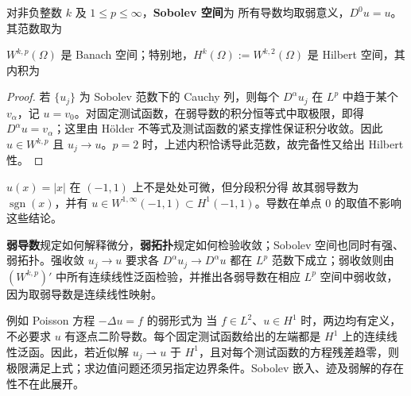 \begin{definition}
    对非负整数 $k$ 及 $1\leqslant p\leqslant\infty$，\textbf{Sobolev 空间}为
    所有导数均取弱意义，$D^0u=u$。其范数取为
\end{definition}

\begin{theorem}
    $W^{k,p}(\Omega)$ 是 Banach 空间；特别地，$H^k(\Omega):=W^{k,2}(\Omega)$ 是 Hilbert 空间，其内积为
\end{theorem}
\begin{proof}
    若 $\{u_j\}$ 为 Sobolev 范数下的 Cauchy 列，则每个 $D^\alpha u_j$ 在 $L^p$ 中趋于某个 $v_\alpha$，记 $u=v_0$。对固定测试函数，在弱导数的积分恒等式中取极限，即得 $D^\alpha u=v_\alpha$；这里由 H\"older 不等式及测试函数的紧支撑性保证积分收敛。因此 $u\in W^{k,p}$ 且 $u_j\to u$。$p=2$ 时，上述内积恰诱导此范数，故完备性又给出 Hilbert 性。
\end{proof}

\begin{example}
    $u(x)=|x|$ 在 $(-1,1)$ 上不是处处可微，但分段积分得
    故其弱导数为 $\operatorname{sgn}(x)$，并有 $u\in W^{1,\infty}(-1,1)\subset H^1(-1,1)$。导数在单点 $0$ 的取值不影响这些结论。
\end{example}

\begin{remark}
    \textbf{弱导数}规定如何解释微分，\textbf{弱拓扑}规定如何检验收敛；Sobolev 空间也同时有强、弱拓扑。强收敛 $u_j\to u$ 要求各 $D^\alpha u_j\to D^\alpha u$ 都在 $L^p$ 范数下成立；弱收敛则由 $(W^{k,p})'$ 中所有连续线性泛函检验，并推出各弱导数在相应 $L^p$ 空间中弱收敛，因为取弱导数是连续线性映射。
\end{remark}

例如 Poisson 方程 $-\Delta u=f$ 的弱形式为
当 $f\in L^2$、$u\in H^1$ 时，两边均有定义，不必要求 $u$ 有逐点二阶导数。每个固定测试函数给出的左端都是 $H^1$ 上的连续线性泛函。因此，若近似解 $u_j\rightharpoonup u$ 于 $H^1$，且对每个测试函数的方程残差趋零，则极限满足上式；求边值问题还须另指定边界条件。Sobolev 嵌入、迹及弱解的存在性不在此展开。
